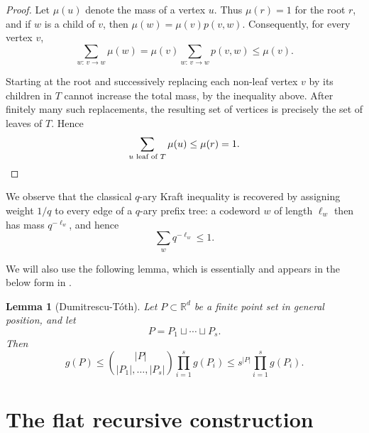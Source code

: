 \documentclass[11pt]{amsart}
\newtheorem{lemma}[lemma]{Lemma}
\theoremstyle{definition}
\begin{document}
\begin{proof}
Let $\mu(u)$ denote the mass of a vertex $u$. Thus $\mu(r)=1$ for the
root $r$, and if $w$ is a child of $v$, then
$\mu(w)=\mu(v)p(v,w)$.
Consequently, for every vertex $v$,
\begin{equation*}
      \sum_{w:\,v\to w}\mu(w)
    =
    \mu(v)\sum_{w:\,v\to w}p(v,w)
    \le \mu(v).
\end{equation*}

Starting at the root and successively
replacing each non-leaf vertex $v$ by its children in
$T$ cannot increase the total mass, by the inequality
above. After finitely many such replacements, the resulting set of
vertices is precisely the set of leaves of $T$. Hence
\begin{equation*}
    \sum_{u \text{ leaf of }T}\mu(u)\le \mu(r)=1. \qedhere
\end{equation*}
    
\end{proof}
We observe that the classical $q$-ary Kraft inequality is recovered by assigning weight
$1/q$ to every edge of a $q$-ary prefix tree: a codeword $w$ of length
$\ell_w$ then has mass $q^{-\ell_w}$, and hence
\begin{equation*}
     \sum_w q^{-\ell_w}\le 1.
\end{equation*}
   
We will also use the following 
lemma, which is essentially 
\cite[Lemma 2]{dumitrescuToth2025peeling} 
and appears in the below form in \cite[Lemma 3.4]{simon2026further}. 
\begin{lemma}[Dumitrescu-T\'oth]\label{lem:partition-bound}
Let $P\subset\mathbb R^d$ be a finite point set in general position,
and let
\begin{equation*}
    P=P_1\sqcup\cdots\sqcup P_s.
\end{equation*}
Then
\begin{equation*}
        g(P)
    \le
    \binom{|P|}{|P_1|,\ldots,|P_s|}
    \prod_{i=1}^s g(P_i)
    \le
    s^{|P|}\prod_{i=1}^s g(P_i).
\end{equation*}
\end{lemma}


\section{The flat recursive construction}\label{sec:construction}
\end{document}
